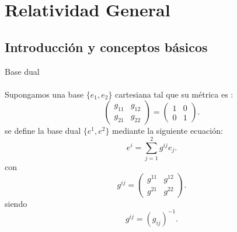 \chapter{Relatividad General}
\section{Introducción y conceptos básicos}

\begin{mydef}
Base dual \\
\\
Supongamos una base $\lbrace e_1,e_2\rbrace$ cartesiana tal que su métrica es :
\[ \begin{pmatrix}
        g_{11} & g_{12}  \\ 
        g_{21} & g_{22}
    \end{pmatrix} =
    \begin{pmatrix} 1 & 0 \\ 0 & 1 \end{pmatrix} 
.\] 
se define la base dual $\lbrace e^1,e^2 \rbrace$ mediante la siguiente ecuación:
\[
    e^i= \sum_{j=1}^{2} g^{ij}e_j
.\] 
con \[
    g^{ij}= \begin{pmatrix} g^{11} & g^{12}  \\ g^{21} & g^{22} \end{pmatrix} 
.\]
siendo 
\[
    g^{ij}= \left( g_{ij} \right) ^{-1}
.\] 
\end{mydef}

